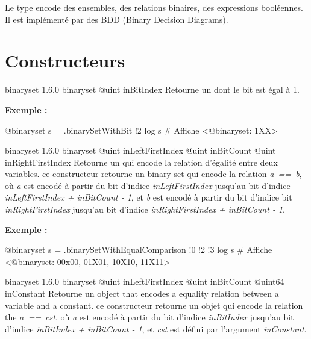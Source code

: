 

Le type  encode des ensembles, des relations binaires, des expressions booléennes. Il est implémenté par des BDD (Binary Decision Diagrams).


\section{Constructeurs}

{binaryset}
{1.6.0}
{binaryset}
{@uint inBitIndex}
{Retourne un  dont le bit  est égal à 1.}
{}


\textbf{Exemple :}
\begin{galgascode}
@binaryset s = .binarySetWithBit {!2}
log s # Affiche <@binaryset: 1XX>
\end{galgascode}





{binaryset}
{1.6.0}
{binaryset}
{@uint inLeftFirstIndex}
{@uint inBitCount}
{@uint inRightFirstIndex}
{Retourne un  qui encode la relation d'égalité entre deux variables.}
{ce constructeur retourne un binary set qui encode la relation \emph{a~==~b}, où \emph{a} est encodé à partir du bit d'indice \emph{inLeftFirstIndex} jusqu'au bit d'indice \emph{inLeftFirstIndex  + inBitCount - 1}, et \emph{b} est encodé à partir du bit d'indice bit \emph{inRightFirstIndex} jusqu'au bit d'indice \emph{inRightFirstIndex + inBitCount - 1}.}

\textbf{Exemple :}
\begin{galgascode}
@binaryset s = .binarySetWithEqualComparison {!0 !2 !3}
log s # Affiche <@binaryset: 00x00, 01X01, 10X10, 11X11>
\end{galgascode}





{binaryset}
{1.6.0}
{binaryset}
{@uint inLeftFirstIndex}
{@uint inBitCount}
{@uint64 inConstant}
{Retourne un  object that encodes a equality relation between a variable and a constant.}
{ce constructeur retourne un objet qui encode la relation the \emph{a~==~cst}, où \emph {a} est encodé à partir du bit d'indice \emph{inBitIndex} jusqu'au bit d'indice \emph{inBitIndex  + inBitCount - 1}, et \emph{cst} est défini par l'argument \emph{inConstant}.}

